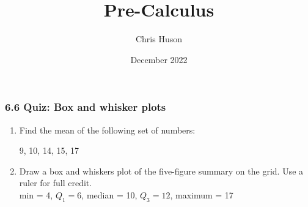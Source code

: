 \documentclass[12pt, twoside]{article}
\title{Pre-Calculus}
\author{Chris Huson}
\date{December 2022}
\begin{document}
\subsubsection*{6.6 Quiz: Box and whisker plots}
\begin{enumerate}
\item Find the mean of the following set of numbers:
  \begin{center}
    9, 10, 14, 15, 17
  \end{center} \vspace{2cm}
  
\item Draw a box and whiskers plot of the five-figure summary on the grid. Use a ruler for full credit. \vspace{0.25cm}\\
min = 4, $Q_1=6$, median = 10, $Q_3=12$, maximum = 17
  \begin{center}
  \end{center}


\end{enumerate}
\end{document}
